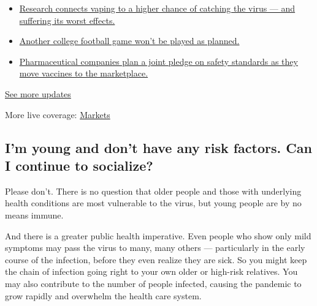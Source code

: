 \begin{itemize}
\tightlist
\item
  \href{https://www.nytimes3xbfgragh.onion/2020/09/04/world/covid-19-coronavirus.html?action=click\&pgtype=Article\&state=default\&region=MAIN_CONTENT_1\&context=storylines_live_updates\#link-1654f6ad}{Research
  connects vaping to a higher chance of catching the virus --- and
  suffering its worst effects.}
\item
  \href{https://www.nytimes3xbfgragh.onion/2020/09/04/world/covid-19-coronavirus.html?action=click\&pgtype=Article\&state=default\&region=MAIN_CONTENT_1\&context=storylines_live_updates\#link-52e4198a}{Another
  college football game won't be played as planned.}
\item
  \href{https://www.nytimes3xbfgragh.onion/2020/09/04/world/covid-19-coronavirus.html?action=click\&pgtype=Article\&state=default\&region=MAIN_CONTENT_1\&context=storylines_live_updates\#link-181cef0}{Pharmaceutical
  companies plan a joint pledge on safety standards as they move
  vaccines to the marketplace.}
\end{itemize}

\href{https://www.nytimes3xbfgragh.onion/2020/09/04/world/covid-19-coronavirus.html?action=click\&pgtype=Article\&state=default\&region=MAIN_CONTENT_1\&context=storylines_live_updates}{See
more updates}

More live coverage:
\href{https://www.nytimes3xbfgragh.onion/live/2020/09/04/business/stock-market-today-coronavirus?action=click\&pgtype=Article\&state=default\&region=MAIN_CONTENT_1\&context=storylines_live_updates}{Markets}

\hypertarget{im-young-and-dont-have-any-risk-factors-can-i-continue-to-socialize}{%
\subsection{I'm young and don't have any risk factors. Can I continue to
socialize?}\label{im-young-and-dont-have-any-risk-factors-can-i-continue-to-socialize}}

Please don't. There is no question that older people and those with
underlying health conditions are most vulnerable to the virus, but young
people are by no means immune.

And there is a greater public health imperative. Even people who show
only mild symptoms may pass the virus to many, many others ---
particularly in the early course of the infection, before they even
realize they are sick. So you might keep the chain of infection going
right to your own older or high-risk relatives. You may also contribute
to the number of people infected, causing the pandemic to grow rapidly
and overwhelm the health care system.

